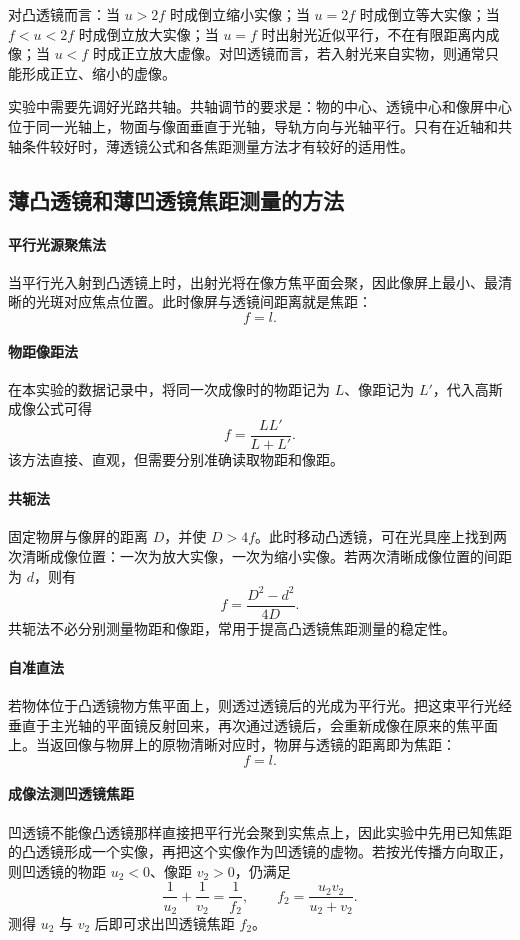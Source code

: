 \documentclass{../template/myrpt}
\begin{document}
对凸透镜而言：当 $u > 2f$ 时成倒立缩小实像；当 $u = 2f$ 时成倒立等大实像；当 $f < u < 2f$ 时成倒立放大实像；当 $u = f$ 时出射光近似平行，不在有限距离内成像；当 $u < f$ 时成正立放大虚像。对凹透镜而言，若入射光来自实物，则通常只能形成正立、缩小的虚像。

实验中需要先调好光路共轴。共轴调节的要求是：物的中心、透镜中心和像屏中心位于同一光轴上，物面与像面垂直于光轴，导轨方向与光轴平行。只有在近轴和共轴条件较好时，薄透镜公式和各焦距测量方法才有较好的适用性。

\subsection{薄凸透镜和薄凹透镜焦距测量的方法}

\paragraph{平行光源聚焦法}
当平行光入射到凸透镜上时，出射光将在像方焦平面会聚，因此像屏上最小、最清晰的光斑对应焦点位置。此时像屏与透镜间距离就是焦距：
\[
  f = l.
\]

\paragraph{物距像距法}
在本实验的数据记录中，将同一次成像时的物距记为 $L$、像距记为 $L'$，代入高斯成像公式可得
\[
  f = \frac{LL'}{L + L'}.
\]
该方法直接、直观，但需要分别准确读取物距和像距。

\paragraph{共轭法}
固定物屏与像屏的距离 $D$，并使 $D > 4f$。此时移动凸透镜，可在光具座上找到两次清晰成像位置：一次为放大实像，一次为缩小实像。若两次清晰成像位置的间距为 $d$，则有
\[
  f = \frac{D^2 - d^2}{4D}.
\]
共轭法不必分别测量物距和像距，常用于提高凸透镜焦距测量的稳定性。

\paragraph{自准直法}
若物体位于凸透镜物方焦平面上，则透过透镜后的光成为平行光。把这束平行光经垂直于主光轴的平面镜反射回来，再次通过透镜后，会重新成像在原来的焦平面上。当返回像与物屏上的原物清晰对应时，物屏与透镜的距离即为焦距：
\[
  f = l.
\]

\paragraph{成像法测凹透镜焦距}
凹透镜不能像凸透镜那样直接把平行光会聚到实焦点上，因此实验中先用已知焦距的凸透镜形成一个实像，再把这个实像作为凹透镜的虚物。若按光传播方向取正，则凹透镜的物距 $u_2 < 0$、像距 $v_2 > 0$，仍满足
\[
  \frac{1}{u_2} + \frac{1}{v_2} = \frac{1}{f_2},
  \qquad
  f_2 = \frac{u_2 v_2}{u_2 + v_2}.
\]
测得 $u_2$ 与 $v_2$ 后即可求出凹透镜焦距 $f_2$。
\end{document}
